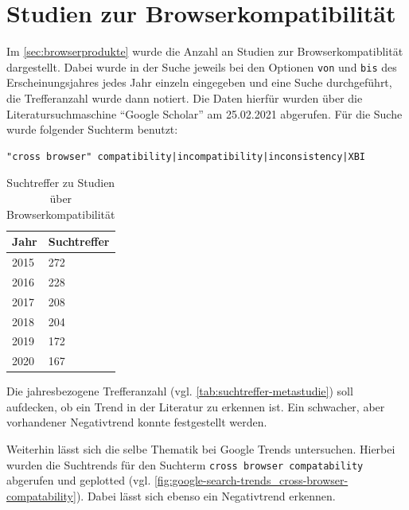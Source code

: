 \section{Studien zur Browserkompatibilität}
\label{sec:studien-zur-browser-kompatibilitaet}

Im \autoref{sec:browserprodukte} wurde die Anzahl an Studien zur Browserkompatiblität dargestellt. Dabei wurde in der Suche jeweils bei den Optionen \texttt{von} und \texttt{bis} des Erscheinungsjahres jedes Jahr einzeln eingegeben und eine Suche durchgeführt, die Trefferanzahl wurde dann notiert. Die Daten hierfür wurden über die Literatursuchmaschine \enquote{Google Scholar} am 25.02.2021 abgerufen. Für die Suche wurde folgender Suchterm benutzt:
\begin{verbatim}
"cross browser" compatibility|incompatibility|inconsistency|XBI
\end{verbatim}

\begin{table}
\centering
\vspace{-\baselineskip}
\begin{tabular}{|l|l|}
  \hline
  Jahr & Suchtreffer \\
  \hline
  2015 & 272 \\
  \hline
  2016 & 228 \\
  \hline
  2017 & 208 \\
  \hline
  2018 & 204 \\
  \hline
  2019 & 172 \\
  \hline
  2020 & 167 \\
  \hline
\end{tabular}
\caption{Suchtreffer zu Studien über Browserkompatibilität}
	\label{tab:suchtreffer-metastudie}
\end{table}

\def\lc{\left\lceil}   
\def\rc{\right\rceil}

Die jahresbezogene Trefferanzahl (vgl. \autoref{tab:suchtreffer-metastudie}) soll aufdecken, ob ein Trend in der Literatur zu erkennen ist. Ein schwacher, aber vorhandener Negativtrend konnte festgestellt werden.

Weiterhin lässt sich die selbe Thematik bei Google Trends \cite{GoogleTrendsCrossBrowserCompatibility} untersuchen. Hierbei wurden die Suchtrends für den Suchterm \texttt{cross browser compatability} abgerufen und geplotted (vgl. \autoref{fig:google-search-trends_cross-browser-compatability}). Dabei lässt sich ebenso ein Negativtrend erkennen.

